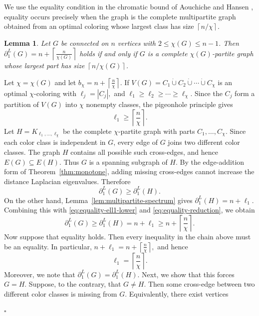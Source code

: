 \documentclass[12pt]{article}
\newcommand{\ceil}[1]{\left\lceil #1 \right\rceil}
\theoremstyle{plain}
\newtheorem{lemma}[theorem]{Lemma}
\theoremstyle{definition}
\renewenvironment{proof}{{\noindent\bfseries Proof. }}{\hfill$\square$\par}
\begin{document}
\noindent  We use the equality condition in the chromatic bound of Aouchiche and Hansen \cite{AouchicheHansen2017}, equality occurs precisely when the graph is the complete multipartite graph obtained from an optimal coloring whose largest class has size $\ceil{n/\chi}$.
\begin{lemma}\label{lem:equality-AH}
Let $G$ be connected on $n$ vertices with $2\le\chi(G)\le n-1$. Then $  \partial_1^L(G)=n+\ceil{\tfrac{n}{\chi(G)}}$ holds if and only if $G$ is a complete $\chi(G)$-partite graph whose largest part has size $\ceil{n/\chi(G)}$. 
\end{lemma}


\begin{proof}
	Let $\chi=\chi(G)$ and let $b_\chi=n+\ceil{\tfrac{n}{\chi}}.$ If  $V(G)=C_1\dot\cup C_2\dot\cup\cdots\dot\cup C_\chi$ is an optimal $\chi$-coloring with  $\ell_j=|C_j|,$ and $\ell_1\ge \ell_2\ge\cdots\ge \ell_\chi.$ 
	Since the $C_j$ form a partition of $V(G)$ into $\chi$ nonempty classes, the pigeonhole principle gives
	\begin{equation}\label{eq:equality-ell1-lower}
		\ell_1\ge \ceil{\frac{n}{\chi}}.
	\end{equation}
	 Let $H=K_{\ell_1,\dots,\ell_\chi}$ be the complete $\chi$-partite graph with parts $C_1,\dots,C_\chi$. Since each color class is independent in $G$, every edge of $G$ joins two different color classes. The graph $H$ contains all possible such cross-edges, and hence $E(G)\subseteq E(H).$ Thus $G$ is a spanning subgraph of $H$. By the edge-addition form of Theorem~\ref{thm:monotone}, adding missing cross-edges cannot increase the distance Laplacian eigenvalues. Therefore
	\begin{equation}\label{eq:equality-reduction}
		\partial_1^L(G)\ge \partial_1^L(H).
	\end{equation}
	On the other hand, Lemma~\ref{lem:multipartite-spectrum} gives
	 $\partial_1^L(H)=n+\ell_1.$ Combining this with \eqref{eq:equality-ell1-lower} and \eqref{eq:equality-reduction}, we obtain
	\[
	\partial_1^L(G)
	\ge
	\partial_1^L(H)
	=
	n+\ell_1
	\ge
	n+\ceil{\frac{n}{\chi}}.
	\]
	 Now suppose that equality holds. Then every inequality in the chain above must be an equality. In particular,
	 $n+\ell_1=n+\ceil{\frac{n}{\chi}},$ 
	and hence
	\begin{equation}\label{eq:equality-largest-class}
		\ell_1=\ceil{\frac{n}{\chi}}.
	\end{equation}
	Moreover, we note that $\partial_1^L(G)=\partial_1^L(H).$  Next, we show that this forces $G=H$. Suppose, to the contrary, that $G\ne H$. Then some cross-edge between two different color classes is missing from $G$. Equivalently, there exist vertices

\end{proof}
\end{document}
